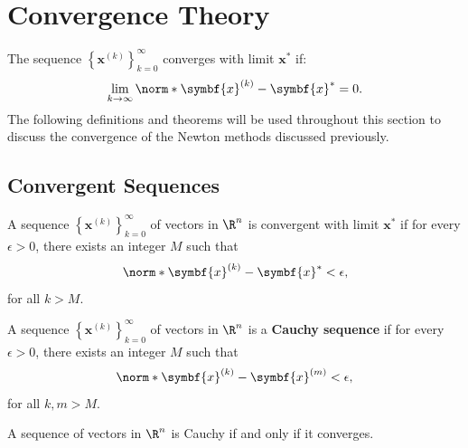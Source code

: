 \documentclass{article}
\begin{document}
\section{Convergence Theory}
The sequence \(\left\{ \symbf{x}^{\left( k \right)} \right\}_{k =
0}^\infty\) converges with limit \(\symbf{x}^\ast\) if:
\begin{equation*}
    \lim_{k \to \infty} \norm*{\symbf{x}^{\left( k \right)} - \symbf{x}^\ast} = 0.
\end{equation*}
The following definitions and theorems will be used throughout this
section to discuss the convergence of the Newton methods discussed
previously.
\subsection{Convergent Sequences}
\begin{definition}
    A sequence \(\left\{ \symbf{x}^{\left( k \right)} \right\}_{k = 0}^\infty\)
    of vectors in \(\R^n\) is convergent with limit \(\symbf{x}^\ast\)
    if for every \(\epsilon > 0\), there exists an integer \(M\) such that
    \begin{equation*}
        \norm*{\symbf{x}^{\left( k \right)} - \symbf{x}^\ast} < \epsilon,
    \end{equation*}
    for all \(k > M\).
\end{definition}
\begin{definition}
    A sequence \(\left\{ \symbf{x}^{\left( k \right)} \right\}_{k = 0}^\infty\)
    of vectors in \(\R^n\) is a \textbf{Cauchy sequence} if for every
    \(\epsilon > 0\), there exists an integer \(M\) such that
    \begin{equation*}
        \norm*{\symbf{x}^{\left( k \right)} - \symbf{x}^{\left( m \right)}} < \epsilon,
    \end{equation*}
    for all \(k,m > M\).
\end{definition}
A sequence of vectors in \(\R^n\) is Cauchy if and only if it converges.
\end{document}
